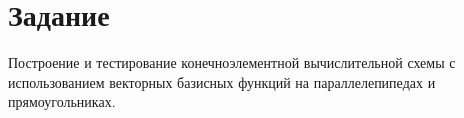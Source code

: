 \chapter*{Задание}


Построение и тестирование конечноэлементной вычислительной схемы с использованием векторных базисных функций на параллелепипедах и прямоугольниках.